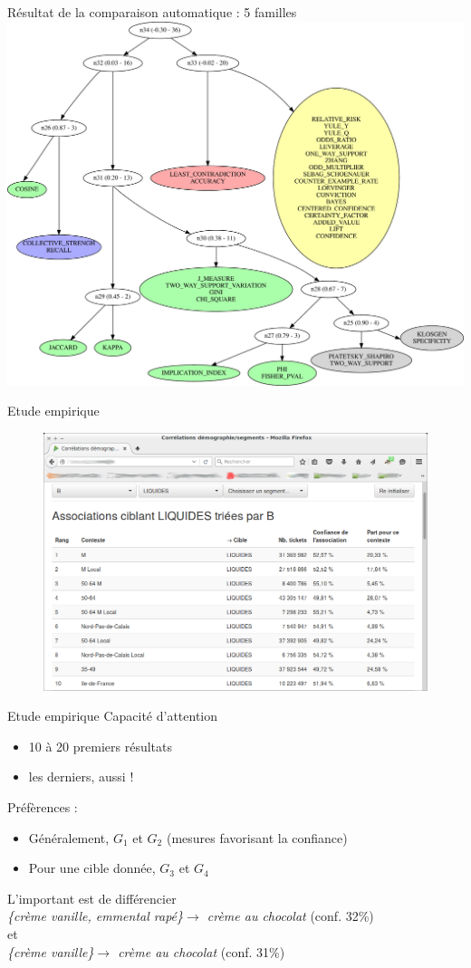 \documentclass[table]{beamer}
\begin{document}
\begin{frame}[t]{Résultat de la comparaison automatique : 5 familles}
  \centering
  \includegraphics[width=0.8\linewidth]{fig/dendograms/patterns_demo-perTarget-NDCG.pdf}
\end{frame}

\begin{frame}[t]{Etude empirique}
  \begin{figure}
    \centering
    \includegraphics[width=0.7\linewidth]{../fig/screenshot_exploration.png}
  \end{figure}
\end{frame}

\begin{frame}{Etude empirique}
  Capacité d'attention
  \begin{itemize}
    \item 10 à 20 premiers résultats
    \item les derniers, aussi !
  \end{itemize}
  \pause
  Préfèrences :
  \begin{itemize}
    \item Généralement, $G_1$ et $G_2$ (mesures favorisant la confiance)
    \item Pour une cible donnée, $G_3$ et $G_4$
  \end{itemize}
  \vspace{1em}
  L'important est de différencier\\
    \textit{\{crème vanille, emmental rapé\}$\rightarrow$ crème au chocolat} (conf. 32\%)\\
  et\\
    \textit{\{crème vanille\}$\rightarrow$ crème au chocolat} (conf. 31\%)
\end{frame}
\end{document}
